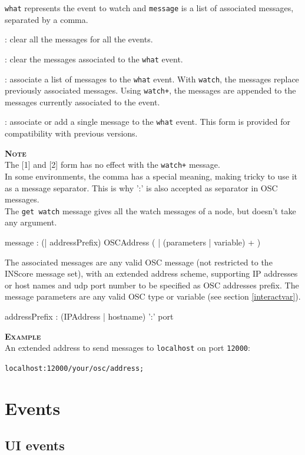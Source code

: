 \documentclass[a4paper,twoside]{report}
\newcommand{\sublevel}[1]	{\section{#1}}
\newcommand{\subsublevel}[1]	{\subsection{#1}}
\newcommand{\OSC}[1]		{\texttt{#1}}
\newcommand{\example}		{\textbf{\hspace{-1.5cm}\textbf{\textsc{Example }}}}
\newcommand{\note}	[1]		{\vspace{2mm}\textbf{\hspace{-1.03cm}\textbf{\textsc{Note #1}}}}
\let\olditemize\itemize
\let\oldenditemize\enditemize
\renewenvironment{itemize} 	{\olditemize \setlength{\itemsep}{1mm}}{\oldenditemize}
\newcommand{\sample}	[1]			{\vspace{-2mm}\begin{center}\colorbox{mygrey}{
								\begin{minipage}[t]{0.9\columnwidth} 
								{\small \texttt{#1}}
								\end{minipage}}\end{center}}
\begin{document}
\OSC{what} represents the event to watch and \OSC{message} is a list of associated messages, separated by a comma. 

\begin{itemize}
\item [1]: clear all the messages for all the events.
\item [2]: clear the messages associated to the \OSC{what} event.
\item [3]: associate a list of messages to the \OSC{what} event. With \OSC{watch}, the messages replace previously associated messages. Using \OSC{watch+}, the messages are appended to the messages currently associated to the event.
\item [4]: associate or add a single message to the \OSC{what} event. This form is provided for compatibility with previous versions.
\end{itemize}

\note{} \\
	The [1] and [2] form has no effect with the \OSC{watch+} message. \\
	In some environments, the comma has a special meaning, making tricky to use it as a message separator. This is why ':' is also accepted as separator in OSC messages. \\
	The \OSC{get watch} message gives all the watch messages of a node, but doesn't take any argument.

\begin{rail} 
message : (| addressPrefix)  OSCAddress ( | (parameters | variable) + )
\end{rail}

The associated messages are any valid OSC message (not restricted to the INScore message set), with an extended address scheme, supporting IP addresses or host names and udp port number to be specified as OSC addresses prefix. The message parameters are any valid OSC type or variable (see section \ref{interactvar}).


\begin{rail} 
addressPrefix : (IPAddress | hostname) ':' port
\end{rail}

\example \\
An extended address to send messages to \OSC{localhost} on port \OSC{12000}:
\sample{localhost:12000/your/osc/address;}

\sublevel{Events}
\label{defevents}


\subsublevel{UI events}
\label{uievents}
\end{document}
